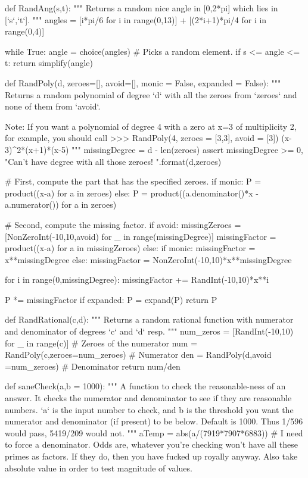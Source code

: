 \begin{sagesilent}
def RandAng(s,t):
    """ Returns a random nice angle in [0,2*pi] which lies in [`s`,`t`].
    """
    angles = [i*pi/6 for i in range(0,13)] + [(2*i+1)*pi/4 for i in range(0,4)]

    while True:
        angle = choice(angles) # Picks a random element.
        if s <= angle <= t:
            return simplify(angle)

def RandPoly(d, zeroes=[], avoid=[], monic = False, expanded = False):
    """ Returns a random polynomial of degree `d` with all the zeroes from
        `zeroes` and none of them from `avoid`.

        Note: If you want a polynomial of degree 4 with a zero at x=3 of
        multiplicity 2, for example, you should call
        >>> RandPoly(4, zeroes = [3,3], avoid = [3])
        (x-3)^2*(x+1)*(x-5)
    """
    missingDegree = d - len(zeroes)
    assert missingDegree >= 0, "Can't have degree {} with all those zeroes! {}".format(d,zeroes)

    # First, compute the part that has the specified zeroes.
    if monic:
        P = product((x-a) for a in zeroes)
    else:
        P = product((a.denominator()*x - a.numerator()) for a in zeroes)

    # Second, compute the missing factor.
    if avoid:
        missingZeroes =[NonZeroInt(-10,10,avoid) for _ in range(missingDegree)]
        missingFactor = product((x-a) for a in missingZeroes)
    else:
        if monic:
            missingFactor = x**missingDegree
        else:
            missingFactor = NonZeroInt(-10,10)*x**missingDegree

        for i in range(0,missingDegree):
            missingFactor += RandInt(-10,10)*x**i
        
    P *= missingFactor
    if expanded:
        P = expand(P)
    return P

def RandRational(c,d):
    """ Returns a random rational function with numerator and denominator of degrees `c` and `d` resp.
    """
    num_zeros = [RandInt(-10,10) for _ in range(c)] # Zeroes of the numerator
    num = RandPoly(c,zeroes=num_zeroes) # Numerator
    den = RandPoly(d,avoid =num_zeroes) # Denominator
    return num/den

def saneCheck(a,b = 1000):
    """ A function to check the reasonable-ness of an answer. It checks the 
        numerator and denominator to see if they are reasonable numbers. `a` is 
        the input number to check, and b is the threshold you want the numerator
        and denominator (if present) to be below. Default is 1000. Thus 1/596
        would pass, 5419/209 would not.
    """
    aTemp = abs(a/(7919*7907*6883)) # I need to force a denominator. Odds are, whatever you're checking won't have all these primes as factors. If they do, then you have fucked up royally anyway. Also take absolute value in order to test magnitude of values.
    

\end{sagesilent}
